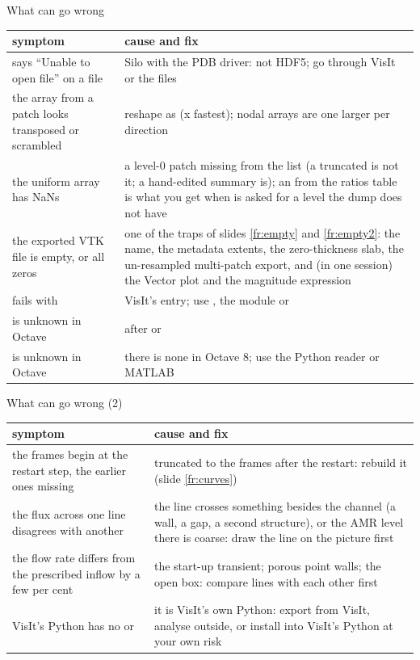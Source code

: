 \documentclass[aspectratio=169,11pt]{beamer}
\begin{document}
\begin{frame}{What can go wrong}
\label{fr:wrong}
\scriptsize
\renewcommand{\arraystretch}{0.95}
\begin{tabular}{@{}L{0.38\textwidth}L{0.55\textwidth}@{}}
\toprule
symptom & cause and fix \\
\midrule
{} says ``Unable to open file'' on a  file & Silo with the PDB driver: not HDF5; go through VisIt or the  files \\
the array from a patch looks transposed or scrambled & reshape as  (x fastest); nodal arrays are one larger per direction \\
the uniform array has NaNs & a level-0 patch missing from the list (a truncated  is not it; a hand-edited summary is); an  from the ratios table is what you get when  is asked for a level the dump does not have \\
the exported VTK file is empty, or all zeros & one of the traps of slides \ref{fr:empty} and \ref{fr:empty2}: the name, the metadata extents, the zero-thickness slab, the un-resampled multi-patch export, and (in one session) the Vector plot and the magnitude expression \\
 fails with  & VisIt's  entry; use , the  module or  \\
 is unknown in Octave &  after  or  \\
 is unknown in Octave & there is none in Octave 8; use the Python reader or MATLAB \\
\bottomrule
\end{tabular}
\end{frame}

\begin{frame}{What can go wrong (2)}
\label{fr:wrong2}
\scriptsize
\renewcommand{\arraystretch}{0.95}
\begin{tabular}{@{}L{0.38\textwidth}L{0.55\textwidth}@{}}
\toprule
symptom & cause and fix \\
\midrule
the frames begin at the restart step, the earlier ones missing &  truncated to the frames after the restart: rebuild it (slide \ref{fr:curves}) \\
the flux across one line disagrees with another & the line crosses something besides the channel (a wall, a gap, a second structure), or the AMR level there is coarse: draw the line on the picture first \\
the flow rate differs from the prescribed inflow by a few per cent & the start-up transient; porous point walls; the open box: compare lines with each other first \\
VisIt's Python has no  or  & it is VisIt's own Python: export from VisIt, analyse outside, or install into VisIt's Python at your own risk \\
\bottomrule
\end{tabular}
\end{frame}
\end{document}
